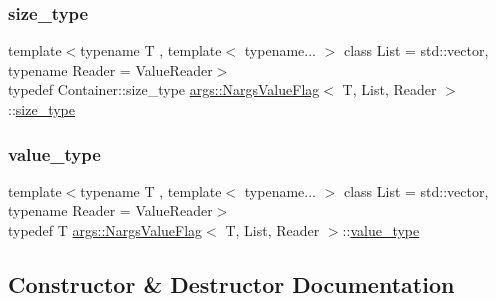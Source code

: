 \mbox{\label{classargs_1_1_nargs_value_flag_ad6cb71619fcb40524cf558993549a5cd}} 
\subsubsection{\texorpdfstring{size\+\_\+type}{size\_type}}
{\footnotesize\ttfamily template$<$typename T , template$<$ typename... $>$ class List = std\+::vector, typename Reader  = Value\+Reader$>$ \\
typedef Container\+::size\+\_\+type \hyperlink{classargs_1_1_nargs_value_flag}{args\+::\+Nargs\+Value\+Flag}$<$ T, List, Reader $>$\+::\hyperlink{classargs_1_1_nargs_value_flag_ad6cb71619fcb40524cf558993549a5cd}{size\+\_\+type}}

\mbox{\label{classargs_1_1_nargs_value_flag_a5d1d4da9eeb02c53489608346310af1b}} 
\subsubsection{\texorpdfstring{value\+\_\+type}{value\_type}}
{\footnotesize\ttfamily template$<$typename T , template$<$ typename... $>$ class List = std\+::vector, typename Reader  = Value\+Reader$>$ \\
typedef T \hyperlink{classargs_1_1_nargs_value_flag}{args\+::\+Nargs\+Value\+Flag}$<$ T, List, Reader $>$\+::\hyperlink{classargs_1_1_nargs_value_flag_a5d1d4da9eeb02c53489608346310af1b}{value\+\_\+type}}



\subsection{Constructor \& Destructor Documentation}
\mbox{\label{classargs_1_1_nargs_value_flag_a49370dd6481756ac2a2177af0068b4bf}} 
